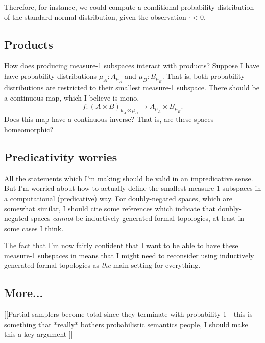 Therefore, for instance, we could compute a conditional probability distribution of the standard normal distribution, given the observation $\cdot < 0$.

\subsection{Products}

How does producing measure-1 subspaces interact with products? Suppose I have have probability distributions $\mu_A : A_{\mu_A}$ and $\mu_B : B_{\mu_B}$. That is, both probability distributions are restricted to their smallest measure-1 subspace. There should be a continuous map, which I believe is mono,
\[f : (A \times B)_{\mu_A \otimes \mu_B} \to A_{\mu_A} \times B_{\mu_B}.\]
Does this map have a continuous inverse? That is, are these spaces homeomorphic?

\subsection{Predicativity worries}
All the statements which I'm making should be valid in an impredicative sense. But I'm worried about how to actually define the smallest measure-1 subspaces in a computational (predicative) way. For doubly-negated spaces, which are somewhat similar, I should cite some references which indicate that doubly-negated spaces \emph{cannot} be inductively generated formal topologies, at least in some cases I think.

The fact that I'm now fairly confident that I want to be able to have these measure-1 subspaces in \contpl{} means that I might need to reconsider using inductively generated formal topologies as \emph{the} main setting for everything.

\subsection{More...}

[[Partial samplers become total since they terminate with probability 1 - this is something that *really* bothers probabilistic semantics people, I should make this a key argument ]]